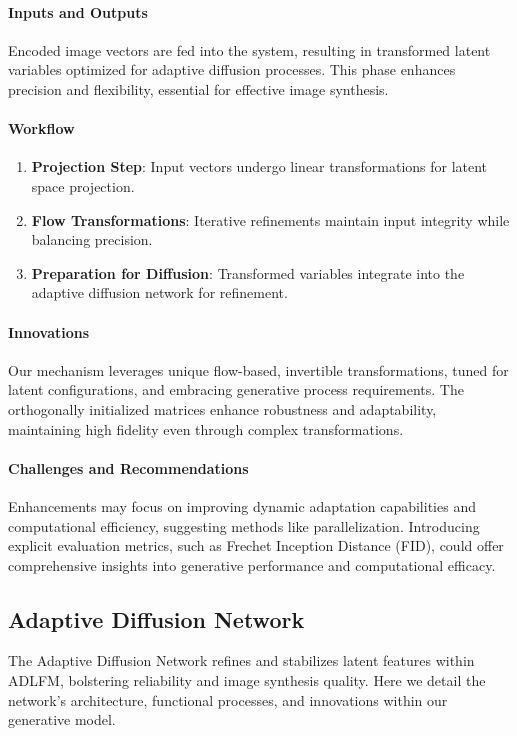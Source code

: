 \documentclass{article} %
\begin{document}
\paragraph{Inputs and Outputs}
Encoded image vectors are fed into the system, resulting in transformed latent variables optimized for adaptive diffusion processes. This phase enhances precision and flexibility, essential for effective image synthesis.

\paragraph{Workflow}
\begin{enumerate}
    \item \textbf{Projection Step}: Input vectors undergo linear transformations for latent space projection.
    \item \textbf{Flow Transformations}: Iterative refinements maintain input integrity while balancing precision.
    \item \textbf{Preparation for Diffusion}: Transformed variables integrate into the adaptive diffusion network for refinement.
\end{enumerate}

\paragraph{Innovations}
Our mechanism leverages unique flow-based, invertible transformations, tuned for latent configurations, and embracing generative process requirements. The orthogonally initialized matrices enhance robustness and adaptability, maintaining high fidelity even through complex transformations.

\paragraph{Challenges and Recommendations}
Enhancements may focus on improving dynamic adaptation capabilities and computational efficiency, suggesting methods like parallelization. Introducing explicit evaluation metrics, such as Frechet Inception Distance (FID), could offer comprehensive insights into generative performance and computational efficacy.

\subsection{Adaptive Diffusion Network}

The Adaptive Diffusion Network refines and stabilizes latent features within ADLFM, bolstering reliability and image synthesis quality. Here we detail the network's architecture, functional processes, and innovations within our generative model.
\end{document}
